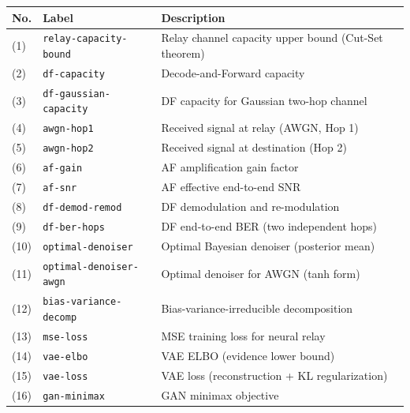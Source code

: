 \documentclass[
  english,
  12pt,
  12pt,
  a4paper,
  oneside]{report}
\newcounter{none} %
\begin{document}
{\def\LTcaptype{none} %
\begin{longtable}[]{@{}
  >{\raggedright\arraybackslash}p{}
  >{\raggedright\arraybackslash}p{}
  >{\raggedright\arraybackslash}p{}@{}}
\toprule\noalign{}
\begin{minipage}[b]{\linewidth}\raggedright
No.
\end{minipage} & \begin{minipage}[b]{\linewidth}\raggedright
Label
\end{minipage} & \begin{minipage}[b]{\linewidth}\raggedright
Description
\end{minipage} \\
\midrule\noalign{}
\endhead
\bottomrule\noalign{}
\endlastfoot
(1) & \texttt{relay-capacity-bound} & Relay channel capacity upper bound (Cut-Set theorem) \\
(2) & \texttt{df-capacity} & Decode-and-Forward capacity \\
(3) & \texttt{df-gaussian-capacity} & DF capacity for Gaussian two-hop channel \\
(4) & \texttt{awgn-hop1} & Received signal at relay (AWGN, Hop 1) \\
(5) & \texttt{awgn-hop2} & Received signal at destination (Hop 2) \\
(6) & \texttt{af-gain} & AF amplification gain factor \\
(7) & \texttt{af-snr} & AF effective end-to-end SNR \\
(8) & \texttt{df-demod-remod} & DF demodulation and re-modulation \\
(9) & \texttt{df-ber-hops} & DF end-to-end BER (two independent hops) \\
(10) & \texttt{optimal-denoiser} & Optimal Bayesian denoiser (posterior mean) \\
(11) & \texttt{optimal-denoiser-awgn} & Optimal denoiser for AWGN (tanh form) \\
(12) & \texttt{bias-variance-decomp} & Bias-variance-irreducible decomposition \\
(13) & \texttt{mse-loss} & MSE training loss for neural relay \\
(14) & \texttt{vae-elbo} & VAE ELBO (evidence lower bound) \\
(15) & \texttt{vae-loss} & VAE loss (reconstruction + KL regularization) \\
(16) & \texttt{gan-minimax} & GAN minimax objective \\

\end{longtable}}
\end{document}
